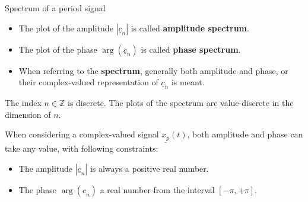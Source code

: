 \begin{refsection}
\begin{definition}{Spectrum of a period signal}
	\begin{itemize}
		\item The plot of the amplitude $|\underline{c}_n|$ is called  \textbf{amplitude spectrum}.
		\item The plot of the phase $\arg\left(\underline{c}_n\right)$ is called  \textbf{phase spectrum}.
		\item When referring to the  \textbf{spectrum}, generally both amplitude and phase, or their complex-valued representation of $\underline{c}_n$ is meant.
	\end{itemize}
\end{definition}

\begin{fact}
	The index $n \in \mathbb{Z}$ is discrete. The plots of the spectrum are value-discrete in the dimension of $n$.
\end{fact}

When considering a complex-valued signal $\underline{x_p}(t)$, both amplitude and phase can take any value, with following constraints:
\begin{itemize}
	\item The amplitude $|\underline{c}_n|$ is always a positive real number.
	\item The phase $\arg\left(\underline{c}_n\right)$ a real number from the interval $[-\pi, +\pi]$.
\end{itemize}%
%


\end{refsection}
